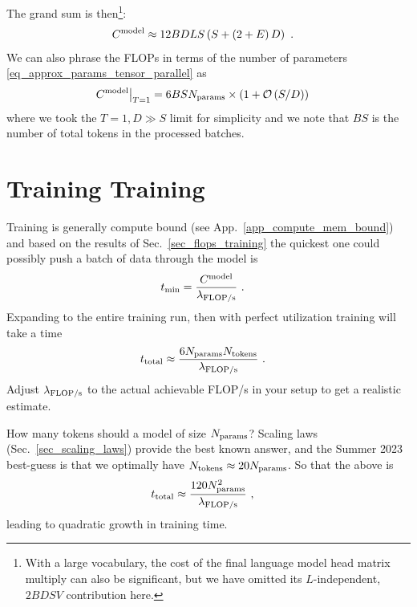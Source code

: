 \documentclass[11pt]{article}
\begin{document}
The grand sum is then\footnote{With a large vocabulary, the cost of the final language model head
	matrix multiply can also be significant, but we have omitted its $ L $-independent,  $ 2BDSV $
	contribution here. }:
\begin{align}
	C  ^{ {\rm  model}  } & \approx 12 BDLS \left ( S + \left ( 2+E \right )D \right ) \label{eq_model_flops}\ .
\end{align}
We can also phrase the FLOPs in terms of the number of parameters \eqref{eq_approx_params_tensor_parallel} as
\begin{align}
	C  ^{ {\rm  model}  } \big| _{ T=1 } & = 6BS N _{ {\rm  params}  }\times \left ( 1 + \mathcal{O} \left( S/D\right)  \right )
\end{align}
where we took the $ T=1, D \gg S $ limit for simplicity and we note that $ BS $  is the number of
total tokens in the processed batches.


\section{Training Training \label{sec_train_time} }



Training is generally compute bound (see App.~\ref{app_compute_mem_bound}) and based on the results
of Sec.~\ref{sec_flops_training} the quickest one could possibly push a batch of data through the
model is
\begin{align}
	t _{ {\rm  min} } & = \frac{ C  ^{ {\rm  model}  }  }{   \lambda _{ {\rm FLOP/s} } }\ . \label{eq_tmin_model}
\end{align}
Expanding to the entire training run, then with perfect utilization training will take a time
\begin{align}
	t _{ {\rm  total} } & \approx  \frac{6N _{ {\rm params} } N _{ {\rm tokens} }}{   \lambda _{ {\rm FLOP/s} } }\ . \label{eq_training_rule_of_thumb}
\end{align}
Adjust $ \lambda _{ {\rm FLOP/s} } $ to the actual achievable FLOP/s in your setup to get a realistic estimate.

How many tokens should a model of size $ N _{ {\rm params} } $? Scaling laws (Sec.~\ref{sec_scaling_laws}) provide
the best known answer, and the Summer 2023 best-guess is that we optimally have $ N _{ {\rm tokens} }\approx 20 N _{ {\rm params} } $.
So that the above is
\begin{align}
	t _{ {\rm  total} } & \approx  \frac{120N _{ {\rm params} } ^{ 2 }}{   \lambda _{ {\rm FLOP/s} } }\ ,
\end{align}
leading to quadratic growth in training time.
\end{document}
